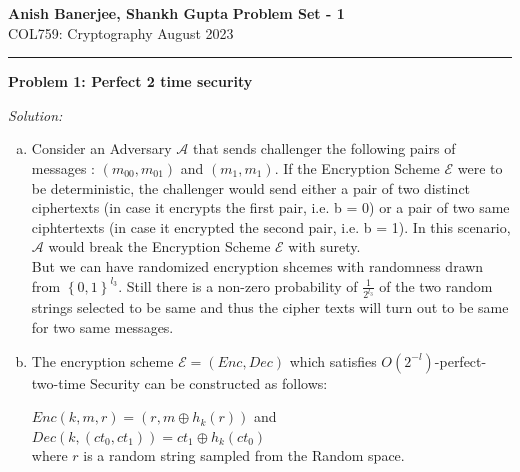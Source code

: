 \documentclass[a4paper, 11pt]{article}
\newcommand{\hr}{\noindent\rule{7in}{2.8pt}}
\newenvironment{solution}
    {\textit{Solution:}}
    {\clearpage}
\newcommand{\prob}[1]{\begin{mdframed}[backgroundcolor=gray!20] \textbf{Problem #1}\end{mdframed}}
\newcommand{\bit}{\left\{0, 1\right\}}
\newcommand{\calA}{\mathcal{A}}
\newcommand{\calE}{\mathcal{E}}
\begin{document}
\noindent
\large\textbf{Anish Banerjee, Shankh Gupta} \hfill \textbf{Problem Set - 1}   \\
\normalsize COL759: Cryptography \hfill August 2023\\
\hr


\prob{1: Perfect 2 time security}
\begin{solution}
        \begin{enumerate}[(a)]
        \item Consider an Adversary $\calA$ that sends challenger the following pairs of messages : $(m_{00}, m_{01})$ and $(m_1, m_1)$. If the Encryption Scheme $\calE$ were to be deterministic, the challenger would send either a pair of two distinct ciphertexts (in case it encrypts the first pair, i.e. b = 0) or a pair of two same ciphtertexts (in case it encrypted the second pair, i.e. b = 1). In this scenario, $\calA$ would break the Encryption Scheme $\calE$ with surety.\\
        But we can have randomized encryption shcemes with randomness drawn from $\bit^{l_3}$. Still there is a non-zero probability of $\frac{1}{2^{l_3}}$ of the two random strings selected to be same and thus the cipher texts will turn out to be same for two same messages. 

        \item The encryption scheme $\calE = (Enc, Dec)$ which satisfies $ O(2^{-l}) $-perfect-two-time Security can be constructed as follows:
        \begin{center}
            $Enc(k, m, r) = (r, m \oplus h_k(r))$ and \\
            $Dec(k, (ct_0, ct_1)) = ct_1 \oplus h_k(ct_0) $ \\ 
            where $r$ is a random string sampled from the Random space.
            

\end{center}
\end{enumerate}
\end{solution}
\end{document}
